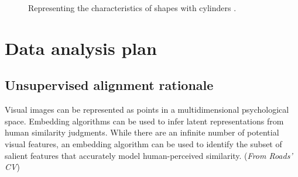 \documentclass[
  authoryear]{elsarticle}
\begin{document}
\begin{figure}


\caption{\label{fig-marr}Representing the characteristics of shapes with
cylinders \citep[figure from][]{marr1997}.}

\end{figure}%

\section{Data analysis plan}\label{data-analysis-plan}

\subsection{Unsupervised alignment
rationale}\label{unsupervised-alignment-rationale}

Visual images can be represented as points in a multidimensional
psychological space. Embedding algorithms can be used to infer latent
representations from human similarity judgments. While there are an
infinite number of potential visual features, an embedding algorithm can
be used to identify the subset of salient features that accurately model
human-perceived similarity. (\emph{From Roads' CV})
\end{document}
